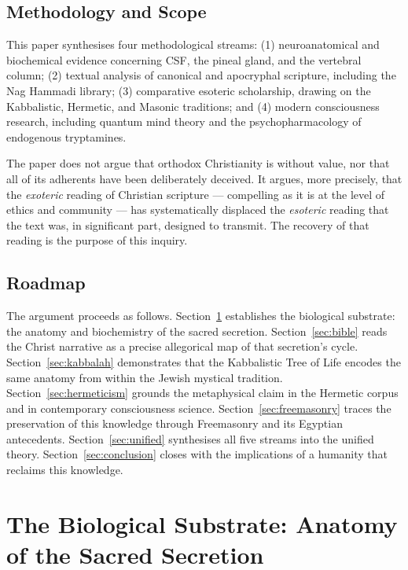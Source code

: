 \documentclass[12pt, a4paper]{article}
\begin{document}
\subsection{Methodology and Scope}

This paper synthesises four methodological streams: (1) neuroanatomical and
biochemical evidence concerning CSF, the pineal gland, and the vertebral
column; (2) textual analysis of canonical and apocryphal scripture, including
the Nag Hammadi library; (3) comparative esoteric scholarship, drawing on the
Kabbalistic, Hermetic, and Masonic traditions; and (4) modern consciousness
research, including quantum mind theory and the psychopharmacology of
endogenous tryptamines.

The paper does not argue that orthodox Christianity is without value, nor that
all of its adherents have been deliberately deceived. It argues, more
precisely, that the \emph{exoteric} reading of Christian scripture —
compelling as it is at the level of ethics and community — has systematically
displaced the \emph{esoteric} reading that the text was, in significant part,
designed to transmit. The recovery of that reading is the purpose of this
inquiry.

\subsection{Roadmap}

The argument proceeds as follows. Section~\ref{sec:biology} establishes the
biological substrate: the anatomy and biochemistry of the sacred secretion.
Section~\ref{sec:bible} reads the Christ narrative as a precise allegorical
map of that secretion's cycle. Section~\ref{sec:kabbalah} demonstrates that
the Kabbalistic Tree of Life encodes the same anatomy from within the Jewish
mystical tradition. Section~\ref{sec:hermeticism} grounds the metaphysical
claim in the Hermetic corpus and in contemporary consciousness science.
Section~\ref{sec:freemasonry} traces the preservation of this knowledge
through Freemasonry and its Egyptian antecedents. Section~\ref{sec:unified}
synthesises all five streams into the unified theory. Section~\ref{sec:conclusion}
closes with the implications of a humanity that reclaims this knowledge.

\section{The Biological Substrate: Anatomy of the Sacred Secretion}
\label{sec:biology}
\end{document}
